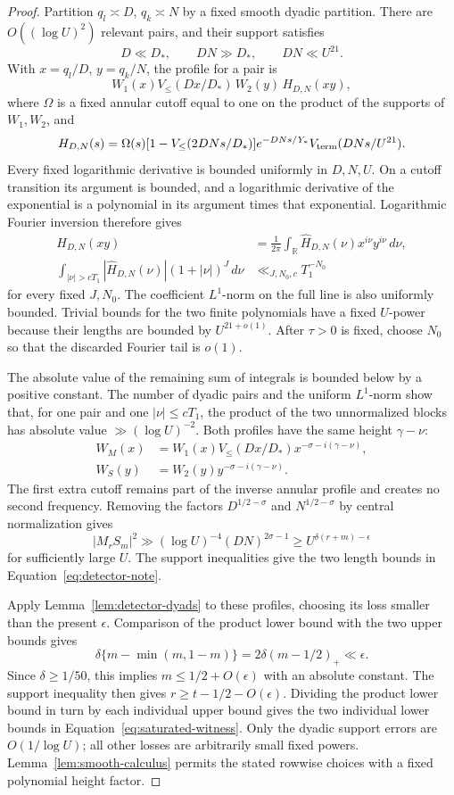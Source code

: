 \documentclass[11pt,a4paper]{article}
\numberwithin{equation}{section}
\numberwithin{figure}{section}
\theoremstyle{definition}
\theoremstyle{remark}
\begin{document}
\begin{proof}
Partition \(q_l\asymp D\), \(q_k\asymp N\) by a fixed smooth
dyadic partition.  There are \(O((\log U)^2)\) relevant pairs,
and their support satisfies
\[
 D\ll D_*,\qquad DN\gg D_*,\qquad DN\ll U^{21}.
\]
With \(x=q_l/D\), \(y=q_k/N\), the profile for a pair is
\[
 W_1(x)V_{\le}(Dx/D_*)\,W_2(y)\,H_{D,N}(xy),
\]
where \(\Omega\) is a fixed annular cutoff equal to one on the
product of the supports of \(W_1,W_2\), and
\[
 H_{D,N}(s)=\Omega(s)
   [1-V_{\le}(2DNs/D_*)]e^{-DNs/Y_*}
   V_{\rm term}(DNs/U^{21}).
\]
Every fixed logarithmic derivative is bounded uniformly in
\(D,N,U\).  On a cutoff transition its argument is bounded, and a
logarithmic derivative of the exponential is a polynomial in its
argument times that exponential.  Logarithmic Fourier inversion
therefore gives
\[
 \begin{split}
 H_{D,N}(xy)&=\frac1{2\pi}\int_{\mathbb R}
      \widehat H_{D,N}(\nu)x^{i\nu}y^{i\nu}\,d\nu,\\
 \int_{|\nu|>cT_1}|\widehat H_{D,N}(\nu)|
       (1+|\nu|)^J\,d\nu&\ll_{J,N_0,c}T_1^{-N_0}
 \end{split}
\]
for every fixed \(J,N_0\).  The coefficient \(L^1\)-norm on the
full line is also uniformly bounded.  Trivial bounds for the two
finite polynomials have a fixed \(U\)-power because their lengths
are bounded by \(U^{21+o(1)}\).  After \(\tau>0\) is fixed, choose
\(N_0\) so that the discarded Fourier tail is \(o(1)\).

The absolute value of the remaining sum of integrals is bounded
below by a positive constant.  The number of dyadic pairs and the
uniform \(L^1\)-norm show that, for one pair and one
\(|\nu|\le cT_1\), the product of the two unnormalized blocks has
absolute value \(\gg(\log U)^{-2}\).  Both profiles have the
same height \(\gamma-\nu\):
\[
 \begin{split}
 W_M(x)&=W_1(x)V_{\le}(Dx/D_*)x^{-\sigma-i(\gamma-\nu)},\\
 W_S(y)&=W_2(y)y^{-\sigma-i(\gamma-\nu)}.
 \end{split}
\]
The first extra cutoff remains part of the inverse annular profile
and creates no second frequency.  Removing the factors
\(D^{1/2-\sigma}\) and \(N^{1/2-\sigma}\) by central normalization
gives
\[
 |M_rS_m|^2\gg(\log U)^{-4}(DN)^{2\sigma-1}
 \ge U^{\delta(r+m)-\epsilon}
\]
for sufficiently large \(U\).  The support inequalities give the
two length bounds in Equation~\eqref{eq:detector-note}.

Apply Lemma~\ref{lem:detector-dyads} to these profiles, choosing its
loss smaller than the present \(\epsilon\).  Comparison of the
product lower bound with the two upper bounds gives
\[
 \delta\{m-\min(m,1-m)\}
   =2\delta(m-1/2)_+\ll\epsilon.
\]
Since \(\delta\ge1/50\), this implies
\(m\le1/2+O(\epsilon)\) with an absolute constant.
The support inequality then gives
\(r\ge t-1/2-O(\epsilon)\).
Dividing the product lower bound in turn by each individual upper
bound gives the two individual lower bounds in
Equation~\eqref{eq:saturated-witness}.  Only the dyadic support
errors are \(O(1/\log U)\); all other losses are arbitrarily small
fixed powers.  Lemma~\ref{lem:smooth-calculus} permits the stated
rowwise choices with a fixed polynomial height factor.
\end{proof}
\end{document}
